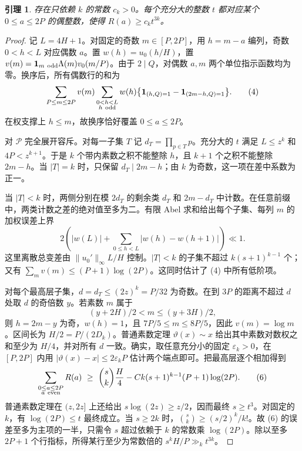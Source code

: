 \documentclass[UTF8,a4paper,11pt,fontset=fandol]{ctexart}
\newtheorem{lemma}[theorem]{引理}
\newcommand{\Lam}{\Lambda}
\newcommand{\ind}{\mathbf 1}
\begin{document}
\begin{lemma}\label{le:sieve}
存在只依赖 \(k\) 的常数 \(c_k>0\)。每个充分大的整数 \(t\) 都对应某个 \(0\le a\le2P\) 的偶整数，使得 \(R(a)\ge c_k t^{3k}\)。
\end{lemma}
\begin{proof}
记 \(L=4H+1\)。对固定的奇数 \(m\in[P,2P]\)，用 \(h=m-a\) 编列，奇数 \(0<h<L\) 对应偶数 \(a\)。置 \(w(h)=u_0(h/H)\)，置
\(v(m)=\ind_{m\ {\rm odd}}\Lam(m)v_0(m/P)\)。由于 \(2\mid Q\)，对偶数 \(a,m\) 两个单位指示函数均为零。换序后，所有偶数行的和为
\[
 \sum_{P\le m\le2P}v(m)\sum_{\substack{0<h<L\\h\ {\rm odd}}}w(h)
       \big\{\ind_{(h,Q)=1}-\ind_{(2m-h,Q)=1}\big\}.          \tag{4}
\]
在权支撑上 \(h\le m\)，故换序恰好覆盖 \(0\le a\le2P\)。

对 \(\mathcal P\) 完全展开容斥。对每一子集 \(T\) 记 \(d_T=\prod_{p\in T}p\)。充分大的 \(t\) 满足 \(L\le z^k\) 和 \(4P<z^{k+1}\)。于是 \(k\) 个带内素数之积不能整除 \(h\)，且 \(k+1\) 个之积不能整除 \(2m-h\)。当 \(|T|=k\) 时，只保留 \(d_T\mid 2m-h\)；由 \(k\) 为奇数，这一项在差中系数为正一。

当 \(|T|<k\) 时，两侧分别在模 \(2d_T\) 的剩余类 \(d_T\) 和 \(2m-d_T\) 中计数。在任意前缀中，两类计数之差的绝对值至多为二。有限 Abel 求和给出每个子集、每列 \(m\) 的加权误差上界
\[
   2\left(|w(L)|+\sum_{0\le h<L}|w(h)-w(h+1)|\right)\ll 1. \tag{5}
\]
这里离散总变差由 \(\|u_0'\|_\infty L/H\) 控制。\(|T|<k\) 的子集不超过 \(k(s+1)^{k-1}\) 个；又有 \(\sum_m v(m)\le(P+1)\log(2P)\)。这同时估计了 (4) 中所有低阶项。

对每个最高层子集，\(d=d_T\le(2z)^k=P/32\) 为奇数。在到 \(3P\) 的距离不超过 \(d\) 处取 \(d\) 的奇倍数 \(y\)。若素数 \(m\) 属于
\[
              (y+2H)/2<m\le(y+3H)/2 ,
\]
则 \(h=2m-y\) 为奇，\(w(h)=1\)，且 \(7P/5\le m\le8P/5\)，因此 \(v(m)=\log m\)。区间长为 \(H/2=P/(2D_k)\)。普通素数定理 \(\vartheta(x)\sim x\) 给出其中素数对数权之和至少为 \(H/4\)，并对所有 \(d\) 一致。确实，取任意充分小的固定 \(\varepsilon_k>0\)，在 \([P,2P]\) 内用 \(|\vartheta(x)-x|\le2\varepsilon_k P\) 估计两个端点即可。把最高层逐个相加得到
\[
 \sum_{\substack{0\le a\le2P\\ a\ {\rm even}}}R(a)
 \ \ge\ \binom{s}{k}\frac H4-C k(s+1)^{k-1}(P+1)\log(2P).  \tag{6}
\]
普通素数定理在 \((z,2z]\) 上还给出 \(s\log(2z)\ge z/2\)，因而最终 \(s\ge t^3\)。对固定的 \(k\)，有 \(\log(2P)\le t\) 最终成立。当 \(s\ge2k\) 时，\(\binom{s}{k}\ge(s/2)^k/k!\)。故 (6) 的误差至多为主项的一半，只需令 \(s\) 超过依赖于 \(k\) 的常数乘 \(\log(2P)\)。除以至多 \(2P+1\) 个行指标，所得某行至少为常数倍的 \(s^kH/P\gg_k t^{3k}\)。
\end{proof}
\end{document}
